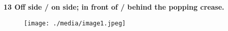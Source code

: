 \documentclass[12pt]{article}
\begin{document}
\vspace{\baselineskip}

\vspace{\baselineskip}

\vspace{\baselineskip}

\vspace{\baselineskip}

\vspace{\baselineskip}

\vspace{\baselineskip}
\begin{Center}
{\fontsize{8pt}{9.6pt}\par}
\end{Center}\par


\vspace{\baselineskip}

\vspace{\baselineskip}
{\fontsize{15pt}{18.0pt}\selectfont \textbf{13 Off side / on side; in front of / behind the popping crease.}\par}\par




\begin{figure}[H]
\advance\leftskip 1.04in		\texttt{[image: ./media/image1.jpeg]}
\end{figure}



\par


\vspace{\baselineskip}

\vspace{\baselineskip}

\vspace{\baselineskip}

\vspace{\baselineskip}

\vspace{\baselineskip}

\vspace{\baselineskip}

\vspace{\baselineskip}

\vspace{\baselineskip}
\end{document}
